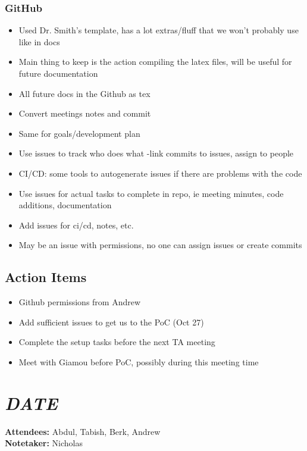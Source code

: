 \documentclass{article}
\begin{document}
			\subsubsection*{GitHub}
				\begin{itemize}
					\item Used Dr. Smith’s template, has a lot extras/fluff that we won’t probably use like in docs
					\item Main thing to keep is the action compiling the latex files, will be useful for future documentation
					\item All future docs in the Github as tex
					\item Convert meetings notes and commit
					\item Same for goals/development plan
					\item Use issues to track who does what -link commits to issues, assign to people
					\item CI/CD: some tools to autogenerate issues if there are problems with the code
					\item Use issues for actual tasks to complete in repo, ie meeting minutes, code additions, documentation
					\item Add issues for ci/cd, notes, etc.
					\item May be an issue with permissions, no one can assign issues or create commits
				\end{itemize}
		\subsection*{Action Items}
			\begin{itemize}
				\item Github permissions from Andrew
				\item Add sufficient issues to get us to the PoC (Oct 27)
				\item Complete the setup tasks before the next TA meeting
				\item Meet with Giamou before PoC, possibly during this meeting time
			\end{itemize}

	
	\pagebreak
	\section*{\textit{DATE}}

	\textbf{Attendees:} Abdul, Tabish, Berk, Andrew\\
	\textbf{Notetaker:} Nicholas
\end{document}
